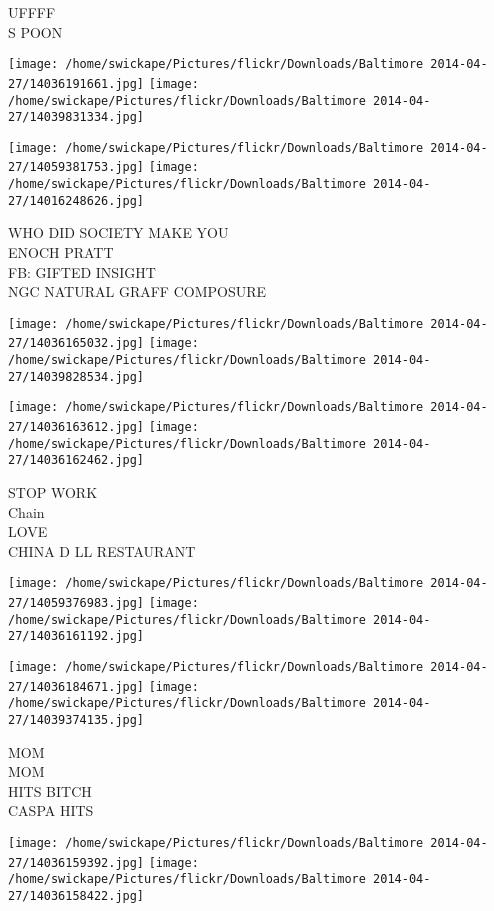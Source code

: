 \documentclass[10pt,letterpaper]{article}
\begin{document}
UFFFF\\
S POON\\
\pagebreak

\texttt{[image: /home/swickape/Pictures/flickr/Downloads/Baltimore 2014-04-27/14036191661.jpg]}
\texttt{[image: /home/swickape/Pictures/flickr/Downloads/Baltimore 2014-04-27/14039831334.jpg]}

\texttt{[image: /home/swickape/Pictures/flickr/Downloads/Baltimore 2014-04-27/14059381753.jpg]}
\texttt{[image: /home/swickape/Pictures/flickr/Downloads/Baltimore 2014-04-27/14016248626.jpg]}

WHO DID SOCIETY MAKE YOU\\
ENOCH PRATT\\
FB: GIFTED INSIGHT\\
NGC NATURAL GRAFF COMPOSURE\\
\pagebreak

\texttt{[image: /home/swickape/Pictures/flickr/Downloads/Baltimore 2014-04-27/14036165032.jpg]}
\texttt{[image: /home/swickape/Pictures/flickr/Downloads/Baltimore 2014-04-27/14039828534.jpg]}

\texttt{[image: /home/swickape/Pictures/flickr/Downloads/Baltimore 2014-04-27/14036163612.jpg]}
\texttt{[image: /home/swickape/Pictures/flickr/Downloads/Baltimore 2014-04-27/14036162462.jpg]}

STOP WORK\\
Chain\\
LOVE\\
CHINA D LL RESTAURANT\\
\pagebreak

\texttt{[image: /home/swickape/Pictures/flickr/Downloads/Baltimore 2014-04-27/14059376983.jpg]}
\texttt{[image: /home/swickape/Pictures/flickr/Downloads/Baltimore 2014-04-27/14036161192.jpg]}

\texttt{[image: /home/swickape/Pictures/flickr/Downloads/Baltimore 2014-04-27/14036184671.jpg]}
\texttt{[image: /home/swickape/Pictures/flickr/Downloads/Baltimore 2014-04-27/14039374135.jpg]}

MOM\\
MOM\\
HITS BITCH\\
CASPA HITS\\
\pagebreak

\texttt{[image: /home/swickape/Pictures/flickr/Downloads/Baltimore 2014-04-27/14036159392.jpg]}
\texttt{[image: /home/swickape/Pictures/flickr/Downloads/Baltimore 2014-04-27/14036158422.jpg]}
\end{document}
